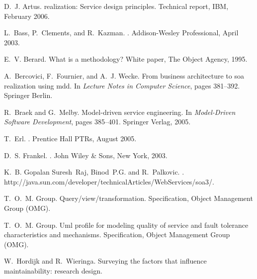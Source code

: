 \documentclass[reviewcopy]{elsart}
\begin{document}
\begin{thebibliography}{10}

D.~J. Artus.
 realization: Service design principles.
\newblock Technical report, IBM, February 2006.

L.~Bass, P.~Clements, and R.~Kazman.
.
\newblock Addison-Wesley Professional, April 2003.

E.~V. Berard.
\newblock What is a methodology?
\newblock White paper, The Object Agency, 1995.

A.~Bercovici, F.~Fournier, and A.~J. Wecke.
\newblock From business architecture to soa realization using mdd.
\newblock In {\em Lecture Notes in Computer Science}, pages 381--392. Springer
  Berlin.

R.~Braek and G.~Melby.
\newblock Model-driven service engineering.
\newblock In {\em Model-Driven Software Development}, pages 385--401. Springer
  Verlag, 2005.

T.~Erl.
.
\newblock Prentice Hall PTRs, August 2005.

D.~S. Frankel.
.
\newblock John Wiley \& Sons, New York, 2003.

K.~B. Gopalan Suresh~Raj, Binod~P.G. and R.~Palkovic.
.
\newblock http://java.sun.com/developer/technicalArticles/WebServices/soa3/.

T.~O.~M. Group.
\newblock Query/view/transformation.
\newblock Specification, Object Management Group (OMG).

T.~O.~M. Group.
\newblock Uml profile for modeling quality of service and fault tolerance
  characteristics and mechanisms.
\newblock Specification, Object Management Group (OMG).

W.~Hordijk and R.~Wieringa.
\newblock Surveying the factors that influence maintainability: research
  design.


\end{thebibliography}
\end{document}
